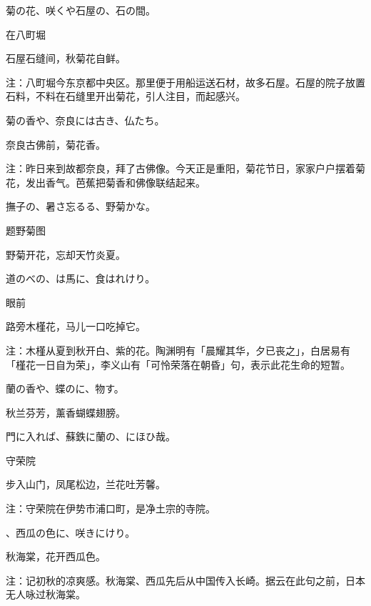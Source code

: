 \begin{haiku}
    {\FH 菊の花、咲くや石屋の、石の間。}

    {\FK 在八町堀}

    {\FK 石屋石缝间，秋菊花自鲜。}

    {\FT 注：八町堀今东京都中央区。那里便于用船运送石材，故多石屋。石屋的院子放置石料，不料在石缝里开出菊花，引人注目，而起感兴。}
\end{haiku}

\begin{haiku}
    {\FH 菊の香や、奈良には古き、仏たち。}

    {\FK 奈良古佛前，菊花香。}

    {\FT 注：昨日来到故都奈良，拜了古佛像。今天正是重阳，菊花节日，家家户户摆着菊花，发出香气。芭蕉把菊香和佛像联结起来。}
\end{haiku}

\begin{haiku}
    {\FH 撫子の、暑さ忘るる、野菊かな。}

    {\FK 题野菊图}

    {\FK 野菊开花，忘却天竹炎夏。}
\end{haiku}

\begin{haiku}
    {\FH 道のべの、は馬に、食はれけり。}

    {\FK 眼前}

    {\FK 路旁木槿花，马儿一口吃掉它。}

    {\FT 注：木槿从夏到秋开白、紫的花。陶渊明有「晨耀其华，夕已丧之」，白居易有「槿花一日自为荣」，李义山有「可怜荣落在朝昏」句，表示此花生命的短暂。}
\end{haiku}

\begin{haiku}
    {\FH 蘭の香や、蝶のに、物す。}

    {\FK 秋兰芬芳，薰香蝴蝶翅膀。}
\end{haiku}

\begin{haiku}
    {\FH 門に入れば、蘇鉄に蘭の、にほひ哉。}

    {\FK 守荣院}

    {\FK 步入山门，凤尾松边，兰花吐芳馨。}

    {\FT 注：守荣院在伊势市浦口町，是净土宗的寺院。}
\end{haiku}

\begin{haiku}
    {\FH {}、西瓜の色に、咲きにけり。}

    {\FK 秋海棠，花开西瓜色。}

    {\FT 注：记初秋的凉爽感。秋海棠、西瓜先后从中国传入长崎。据云在此句之前，日本无人咏过秋海棠。}
\end{haiku}


